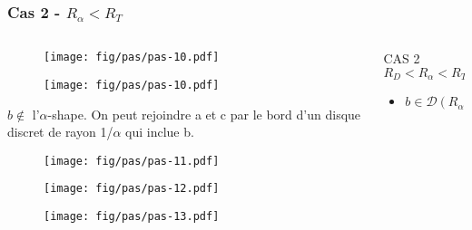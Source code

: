 \begin{frame}
  \frametitle{Cas 2 - $R_{\alpha} < R_T$}

\begin{columns}[t]
    \begin{column}{7cm}
      {
        \begin{figure}[h!]
          \centering
          \texttt{[image: fig/pas/pas-10.pdf]}
        \end{figure}
      }
      {
        \begin{figure}[h!]
          \centering
          \texttt{[image: fig/pas/pas-10.pdf]}
        \end{figure}

				\begin{block}{$b \notin$ l'$\alpha$-shape.}
          On peut rejoindre a et c par le bord d'un disque discret de rayon 1/$\alpha$ qui inclue b.
        \end{block}

      }
      {
        \begin{figure}[h!]
          \centering
          \texttt{[image: fig/pas/pas-11.pdf]}
        \end{figure}
      }
      {
        \begin{figure}[h!]
          \centering
          \texttt{[image: fig/pas/pas-12.pdf]}
        \end{figure}
      }
      {
        \begin{figure}[h!]
          \centering
          \texttt{[image: fig/pas/pas-13.pdf]}
        \end{figure}
			}
    \end{column}
    \begin{column}{3cm}
      \begin{block}{}
        {
          \alert{CAS 2}
          \alert{$R_D < R_{\alpha} < R_T$}\\
        }
        {
          \begin{itemize}
            \item $b \in \mathcal{D} \left( R_{\alpha} \right)$
          \end{itemize}
          
}
\end{block}
\end{column}
\end{columns}
\end{frame}
